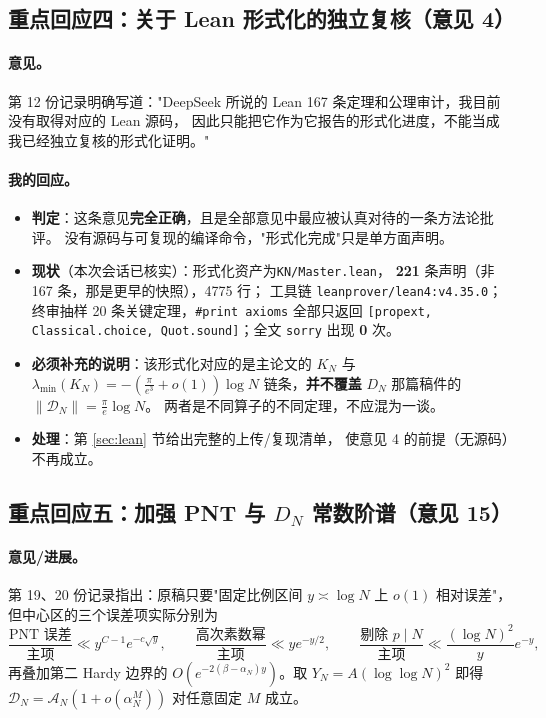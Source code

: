 \documentclass[11pt,a4paper]{ctexart}
\newcommand{\Dk}{\mathcal{D}}
\newcommand{\Ak}{\mathcal{A}}
\newcommand{\al}{\alpha_{N}}
\newcommand{\be}{\beta}
\begin{document}
\subsection{重点回应四：关于 Lean 形式化的独立复核（意见 4）}

\paragraph{意见。}
第 12 份记录明确写道："DeepSeek 所说的 Lean 167 条定理和公理审计，我目前没有取得对应的 Lean 源码，
因此只能把它作为它报告的形式化进度，不能当成我已经独立复核的形式化证明。"

\paragraph{我的回应。}
\begin{itemize}
\item \textbf{判定}：这条意见\textbf{完全正确}，且是全部意见中最应被认真对待的一条方法论批评。
没有源码与可复现的编译命令，"形式化完成"只是单方面声明。
\item \textbf{现状}（本次会话已核实）：形式化资产为\texttt{KN/Master.lean}，
\textbf{221} 条声明（非 167 条，那是更早的快照），4775 行；
工具链 \texttt{leanprover/lean4:v4.35.0}；
终审抽样 20 条关键定理，\texttt{\#print axioms} 全部只返回
\texttt{[propext, Classical.choice, Quot.sound]}；全文 \texttt{sorry} 出现 \textbf{0} 次。
\item \textbf{必须补充的说明}：该形式化对应的是主论文的 $K_N$ 与 $\lambda_{\min}(K_N)=-(\frac{\pi}{e^3}+o(1))\log N$
链条，\textbf{并不覆盖} $D_N$ 那篇稿件的 $\|\mathcal D_N\|=\frac{\pi}{e}\log N$。
两者是不同算子的不同定理，不应混为一谈。
\item \textbf{处理}：第 \ref{sec:lean} 节给出完整的上传/复现清单，
使意见 4 的前提（无源码）不再成立。
\end{itemize}

\subsection{重点回应五：加强 PNT 与 $D_N$ 常数阶谱（意见 15）}

\paragraph{意见/进展。}
第 19、20 份记录指出：原稿只要"固定比例区间 $y\asymp\log N$ 上 $o(1)$ 相对误差"，
但中心区的三个误差项实际分别为
\[
\frac{\text{PNT 误差}}{\text{主项}}\ll y^{C-1}e^{-c\sqrt y},\qquad
\frac{\text{高次素数幂}}{\text{主项}}\ll ye^{-y/2},\qquad
\frac{\text{剔除 }p\mid N}{\text{主项}}\ll\frac{(\log N)^2}{y}e^{-y},
\]
再叠加第二 Hardy 边界的 $O(e^{-2(\be-\al)y})$。取 $Y_N=A(\log\log N)^2$ 即得
$\Dk_N=\Ak_N(1+o(\al^M))$ 对任意固定 $M$ 成立。
\end{document}
